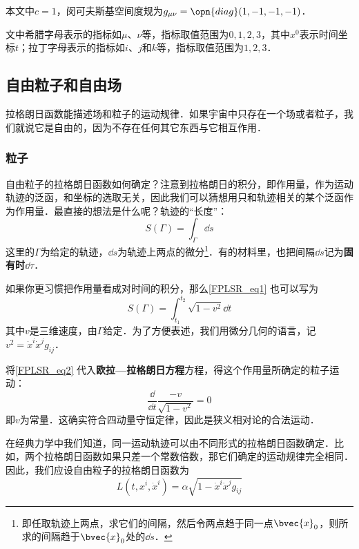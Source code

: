 

本文中$c=1$，闵可夫斯基空间度规为$g_{\mu\nu} = \opn{diag}(1, -1, -1, -1)$．

文中希腊字母表示的指标如$\mu$、$\nu$等，指标取值范围为$0, 1, 2, 3$，其中$x^0$表示时间坐标$t$；拉丁字母表示的指标如$i$、$j$和$k$等，指标取值范围为$1, 2, 3$．

\subsection{自由粒子和自由场}

拉格朗日函数能描述场和粒子的运动规律．如果宇宙中只存在一个场或者粒子，我们就说它是自由的，因为不存在任何其它东西与它相互作用．

\subsubsection{粒子}

自由粒子的拉格朗日函数如何确定？注意到拉格朗日的积分，即作用量，作为运动轨迹的泛函，和坐标的选取无关，因此我们可以猜想用只和轨迹相关的某个泛函作为作用量．最直接的想法是什么呢？轨迹的“长度”：
\begin{equation}\label{FPLSR_eq1}
S(\Gamma) = \int_\Gamma \dd s
\end{equation}
这里的$\Gamma$为给定的轨迹，$\dd s$为轨迹上两点的微分\footnote{即任取轨迹上两点，求它们的间隔，然后令两点趋于同一点$\bvec{x}_0$，则所求的间隔趋于$\bvec{x}_0$处的$\dd s$．}．有的材料里，也把间隔$\dd s$记为\textbf{固有时}$\dd \tau$．

如果你更习惯把作用量看成对时间的积分，那么\autoref{FPLSR_eq1} 也可以写为
\begin{equation}\label{FPLSR_eq2}
S(\Gamma) = \int_{t_1}^{t_2} \sqrt{1-v^2} \dd t
\end{equation}
其中$v$是三维速度，由$\Gamma$给定．为了方便表述，我们用微分几何的语言，记$v^2=\dot{x}^i\dot{x}^jg_{ij}$．

将\autoref{FPLSR_eq2} 代入\textbf{欧拉—拉格朗日方程}方程，得这个作用量所确定的粒子运动：
\begin{equation}
\frac{\dd}{\dd t}\frac{-v}{\sqrt{1-v^2}} = 0
\end{equation}
即$v$为常量．这确实符合四动量守恒定律，因此是狭义相对论的合法运动．

在经典力学中我们知道，同一运动轨迹可以由不同形式的拉格朗日函数确定．比如，两个拉格朗日函数如果只差一个常数倍数，那它们确定的运动规律完全相同．因此，我们应设自由粒子的拉格朗日函数为
\begin{equation}
L(t, x^i, \dot{x}^i) = \alpha\sqrt{1-\dot{x}^i\dot{x}^jg_{ij}}
\end{equation}

